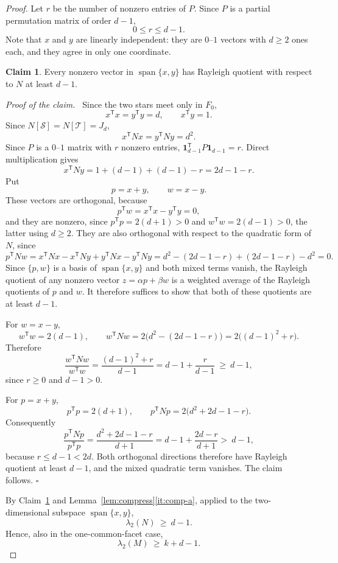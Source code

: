 \documentclass[11pt,reqno]{amsart}
\numberwithin{equation}{section}
\theoremstyle{plain}
\theoremstyle{definition}
\newtheorem{innerclaim}{Claim}
\newenvironment{claim}{\begin{innerclaim}}{\end{innerclaim}}
\newenvironment{claimproof}
  {\par\smallskip\noindent\textit{Proof of the claim.}\ }
  {\hfill$\square$\par\smallskip}
\newcommand{\ones}{\mathbf{1}}
\newcommand{\T}{\mathsf{T}}
\newcommand{\Sset}{\mathcal S}
\newcommand{\Tset}{\mathcal T}
\DeclareMathOperator{\spn}{span}
\begin{document}
\begin{proof}
Let $r$ be the number of nonzero entries of $P$. Since $P$ is a partial permutation matrix of
order $d-1$,
\[
  0\le r\le d-1 .
\]
 Note that $x$ and $y$ are
linearly independent: they are $0$--$1$ vectors with $d\ge2$ ones each, and they agree in only
one coordinate.

\begin{claim}\label{cl:rayleigh}
Every nonzero vector in $\spn\{x,y\}$ has Rayleigh quotient with respect to $N$ at least $d-1$.
\end{claim}

\begin{claimproof}
Since the two stars meet only in $F_0$,
\[
  x^{\T}x=y^{\T}y=d,\qquad x^{\T}y=1 .
\]
Since $N[\Sset]=N[\Tset]=J_d$,
\[
  x^{\T}Nx=y^{\T}Ny=d^2 .
\]
Since $P$ is a $0$--$1$ matrix with $r$ nonzero entries,
$\ones_{d-1}^{\T}P\ones_{d-1}=r$. Direct multiplication gives
\[
  x^{\T}Ny=1+(d-1)+(d-1)-r=2d-1-r .
\]
Put
\[
  p=x+y,\qquad w=x-y .
\]
These vectors are orthogonal, because
\[
  p^{\T}w=x^{\T}x-y^{\T}y=0 ,
\]
and they are nonzero, since $p^{\T}p=2(d+1)>0$ and $w^{\T}w=2(d-1)>0$, the latter using
$d\ge2$. They are also orthogonal with respect to the quadratic form of $N$, since
\[
  p^{\T}Nw=x^{\T}Nx-x^{\T}Ny+y^{\T}Nx-y^{\T}Ny=d^2-(2d-1-r)+(2d-1-r)-d^2=0 .
\]
Since $\{p,w\}$ is a basis of $\spn\{x,y\}$ and both mixed terms vanish, the Rayleigh quotient
of any nonzero vector $z=\alpha p+\beta w$ is a weighted average of the Rayleigh quotients of
$p$ and $w$. It therefore suffices to show that both of these quotients are at least $d-1$.

For $w=x-y$,
\[
  w^{\T}w=2(d-1),\qquad
  w^{\T}Nw=2\bigl(d^2-(2d-1-r)\bigr)=2\bigl({(d-1)}^{2}+r\bigr) .
\]
Therefore
\[
  \frac{w^{\T}Nw}{w^{\T}w}=\frac{{(d-1)}^{2}+r}{d-1}=d-1+\frac{r}{d-1}\ \ge\ d-1 ,
\]
since $r\ge0$ and $d-1>0$.

For $p=x+y$,
\[
  p^{\T}p=2(d+1),\qquad p^{\T}Np=2\bigl(d^2+2d-1-r\bigr) .
\]
Consequently
\[
  \frac{p^{\T}Np}{p^{\T}p}
  =\frac{d^2+2d-1-r}{d+1}
  =d-1+\frac{2d-r}{d+1} >\ d-1 ,
\]
because $r\le d-1<2d$. Both orthogonal directions therefore have Rayleigh quotient at least
$d-1$, and the mixed quadratic term vanishes. The claim follows.
\end{claimproof}

By Claim~\ref{cl:rayleigh} and Lemma~\ref{lem:compress}\ref{it:comp-a}, applied to the
two-dimensional subspace $\spn\{x,y\}$,
\[
  \lambda_2(N)\ \ge\ d-1 .
\]
Hence, also in the one-common-facet case,
\[
  \lambda_2(M)\ \ge\ k+d-1 .
\]


\end{proof}
\end{document}
